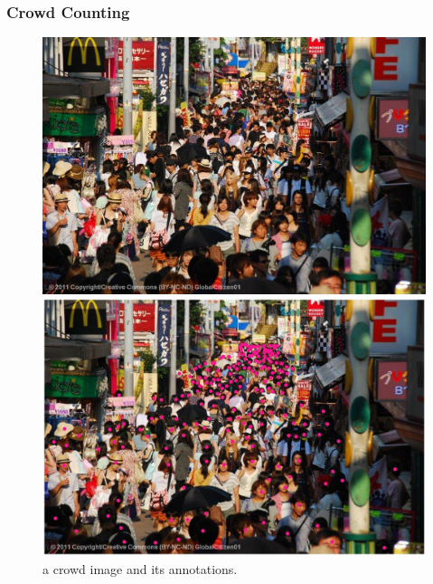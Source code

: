 \begin{frame}
\frametitle{Crowd Counting}

\begin{figure}[htbp]
\centering
\begin{minipage}{.45\textwidth}
\centering
\includegraphics[width=0.95\linewidth]{images/img.jpg}
\end{minipage}%
\begin{minipage}{.45\textwidth}
\centering
\includegraphics[width=0.95\linewidth]{images/img_with_ann.jpg}
\end{minipage}
\label{fig:1}
\caption{a crowd image and its annotations.}
\end{figure}

\end{frame}

